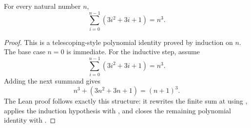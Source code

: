 
\begin{theorem}
  \label{thm:cubic_increment_sum}
  \leanok
  For every natural number $n$,
  \[
    \sum_{i=0}^{n-1} \left(3i^2 + 3i + 1\right) = n^3.
  \]
\end{theorem}

\begin{proof}
  This is a telescoping-style polynomial identity proved by induction on $n$.
  The base case $n=0$ is immediate. For the inductive step, assume
  \[
    \sum_{i=0}^{n-1} \left(3i^2 + 3i + 1\right) = n^3.
  \]
  Adding the next summand gives
  \[
    n^3 + \left(3n^2 + 3n + 1\right) = (n+1)^3.
  \]
  The Lean proof follows exactly this structure: it rewrites the finite sum at
  \texttt{} using
  \texttt{}, applies the induction
  hypothesis with \texttt{}, and closes the remaining
  polynomial identity with \texttt{}.
\end{proof}
